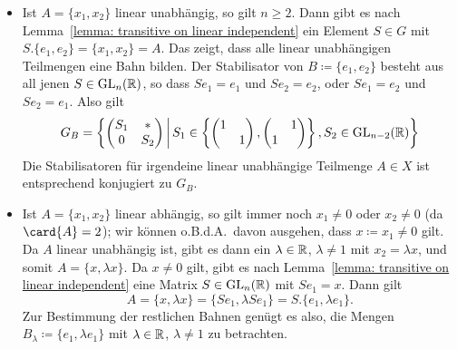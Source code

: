 \begin{itemize}
  \item
    Ist $A = \{x_1, x_2\}$ linear unabhängig, so gilt $n \geq 2$.
    Dann gibt es nach Lemma~\ref{lemma: transitive on linear independent} ein Element $S \in G$ mit $S.\{e_1, e_2\} = \{x_1, x_2\} = A$.
    Das zeigt, dass alle linear unabhängigen Teilmengen eine Bahn bilden.
    Der Stabilisator von $B \coloneqq \{e_1, e_2\}$ besteht aus all jenen $S \in \operatorname{GL}_{n}(\mathbb{R})$, so dass $Se_1 = e_1$ und $Se_2 = e_2$, oder $Se_1 = e_2$ und $Se_2 = e_1$.
    Also gilt
    \[
        G_B
      = \left\{
          \begin{pmatrix}
            S_1 & *   \\
            0   & S_2
          \end{pmatrix}
          \suchthat*
              S_1
          \in \left\{
                \begin{pmatrix}
                  1 &   \\
                    & 1
                \end{pmatrix},
                \begin{pmatrix}
                    & 1 \\
                  1 &
                \end{pmatrix}
              \right\},
              S_2
          \in \GL{n-2}{\Real}
        \right\}
    \]
    Die Stabilisatoren für irgendeine linear unabhängige Teilmenge $A \in X$ ist entsprechend konjugiert zu $G_B$.
  \item
    Ist $A = \{x_1, x_2\}$ linear abhängig, so gilt immer noch $x_1 \neq 0$ oder $x_2 \neq 0$ (da $\card{A} = 2$);
    wir können o.B.d.A.\ davon ausgehen, dass $x \coloneqq x_1 \neq 0$ gilt.
    Da $A$ linear unabhängig ist, gibt es dann ein $\lambda \in \mathbb{R}$, $\lambda \neq 1$ mit $x_2 = \lambda x$, und somit $A = \{x, \lambda x\}$.
    Da $x \neq 0$ gilt, gibt es nach Lemma~\ref{lemma: transitive on linear independent} eine Matrix $S \in \operatorname{GL}_{n}(\mathbb{R})$ mit $Se_1 = x$.
    Dann gilt
    \[
        A
      = \{ x, \lambda x \}
      = \{ Se_1, \lambda Se_1 \}
      = S.\{ e_1, \lambda e_1 \}.
    \]
    Zur Bestimmung der restlichen Bahnen genügt es also, die Mengen $B_\lambda \coloneqq \{e_1, \lambda e_1\}$ mit $\lambda \in \mathbb{R}$, $\lambda \neq 1$ zu betrachten.
    

\end{itemize}
